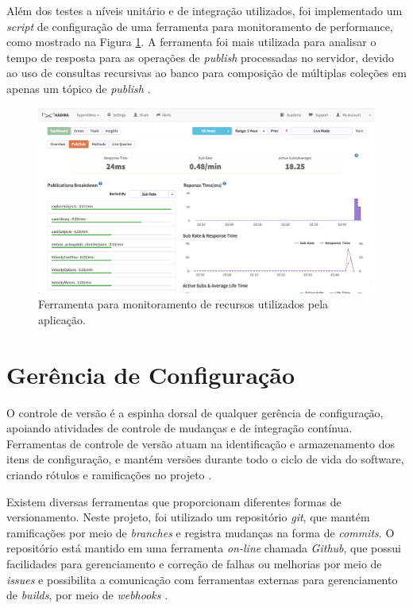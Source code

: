 Além dos testes a níveis unitário e de integração utilizados, foi implementado um \textit{script} de configuração de uma ferramenta para monitoramento de performance, como mostrado na Figura \ref{fig:profile}. A ferramenta foi mais utilizada para analisar o tempo de resposta para as operações de \textit{publish} processadas no servidor, devido ao uso de consultas recursivas ao banco para composição de múltiplas coleções em apenas um tópico de \textit{publish} \cite{kadira2015}.

\begin{figure}[h!]
  	\centering
  	\includegraphics[width=.8\linewidth]{figuras/profile.eps}
  	\caption{Ferramenta para monitoramento de recursos utilizados pela aplicação.}
  	\label{fig:profile}
\end{figure}

\section{Gerência de Configuração}

O controle de versão é a espinha dorsal de qualquer gerência de configuração, apoiando atividades de controle de mudanças e de integração contínua. Ferramentas de controle de versão atuam na identificação e armazenamento dos itens de configuração, e mantém versões durante todo o ciclo de vida do software, criando rótulos e ramificações no projeto \cite{swebok2014}. 

Existem diversas ferramentas que proporcionam diferentes formas de versionamento. Neste projeto, foi utilizado um repositório \textit{git}, que mantém ramificações por meio de \textit{branches} e registra mudanças na forma de \textit{commits}. O repositório está mantido em uma ferramenta \textit{on-line} chamada \textit{Github}, que possui facilidades para gerenciamento e correção de falhas ou melhorias por meio de \textit{issues} e possibilita a comunicação com ferramentas externas para gerenciamento de \textit{builds}, por meio de \textit{webhooks} \cite{github2015}.

